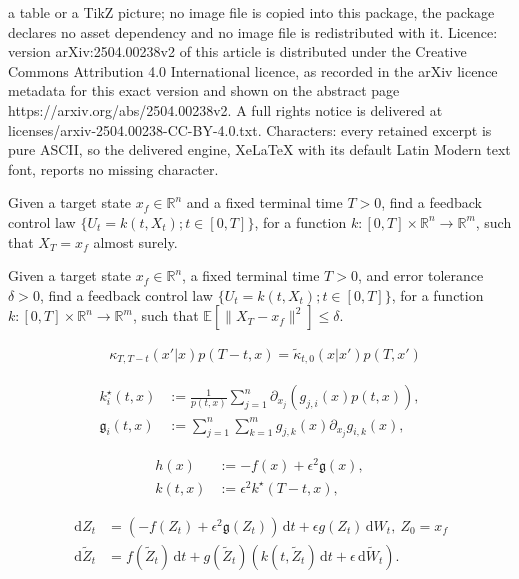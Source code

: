 \documentclass[10pt,a4paper]{amsart}
\def\R{\mathbb{R}}
\newcommand{\ud}{\,\mathrm{d}}
\begin{document}
a table or a TikZ picture; no image file is copied into this package, the package declares no asset dependency and no image file is redistributed with it. Licence: version arXiv:2504.00238v2 of this article is distributed under the Creative Commons Attribution 4.0 International licence, as recorded in the arXiv licence metadata for this exact version and shown on the abstract page https://arxiv.org/abs/2504.00238v2. A full rights notice is delivered at licenses/arxiv-2504.00238-CC-BY-4.0.txt. Characters: every retained excerpt is pure ASCII, so the delivered engine, XeLaTeX with its default Latin Modern text font, reports no missing character.
\begin{problem}\label{prob:steer-to-y}
    Given a target state $x_f \in  \R^n$ and a fixed terminal time $T>0$, find a feedback control law $\{U_t=k(t,X_t);t\in[0,T]\}$, for a function $k: [0,T] \times \R^n \rightarrow \R^m$, such that  $X_T = x_f$ almost surely.
\end{problem}

\begin{problem}\label{prob:approx-steer-to-y}
    Given a target state $x_f \in  \R^n$, a fixed terminal time $T>0$, and error tolerance $\delta>0$, find a feedback control law $\{U_t=k(t,X_t);t\in[0,T]\}$, for a function $k: [0,T] \times \R^n \rightarrow \R^m$, such that  $\mathbb E[\|X_T - x_f\|^2]\leq \delta$.
\end{problem} 

\begin{align}\label{eq:kappa-identity}
   &\kappa_{T,T-t}(x'|x) p(T-t,x) = \tilde \kappa_{t,0}(x|x') p(T,x')
\end{align}

\begin{align}\label{eq:k-star}
     k_i^\star(t,x) &\mathrel{:=} \frac{1}{ p(t,x)} \sum_{j=1}^n \partial_{x_j}(g_{j,i}(x)  p(t,x)),\\
 \mathfrak g_i(t,x) &\mathrel{:=} \sum_{j=1}^n \sum_{k=1}^m g_{j,k}(x) \partial_{x_j}g_{i,k}(x), \label{eq:frak-g}  
\end{align}

\begin{align}\label{eq:tilde-f}
    h(x) &:= -f(x) +  \epsilon^2 \mathfrak  g(x),\\
    k(t,x) &:= \epsilon^2 k^\star(T-t,x),\label{eq:fbcontrol}
\end{align}

\begin{align}\label{eq:Z-alg}
\ud Z_t &= (-f(Z_t) + \epsilon^2 \mathfrak g(Z_t))\ud t +  \epsilon g(Z_t) \ud W_t,~Z_0=x_f
\\ \ud \tilde Z_t &= 
    f(\tilde Z_t)\ud t+  g(\tilde Z_t) (k(t,\tilde Z_t)\ud t + \epsilon \ud \tilde W_t).\label{eq:tilde-Z-alg}
\end{align}
\end{document}
